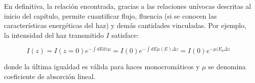 En definitiva, la relación encontrada, gracias a las relaciones unívocas descritas al inicio del capítulo, permite cuantificar flujo, fluencia (si se conocen las características energéticas del haz) y demás cantidades vinculadas. Por ejemplo, la intensidad del haz transmitido $I$ satisface:

\begin{equation}
 I(z) = I(z=0) e^{-\int dE dz \mu} = I(0) e^{- \int dE \mu(E) \Delta z} = I(0) e^{-\mu(E_{0}\Delta z}
\end{equation}

\noindent
donde la última igualdad es válida para haces monocromáticos y $\mu$ se denomina coeficiente de absorción lineal.







